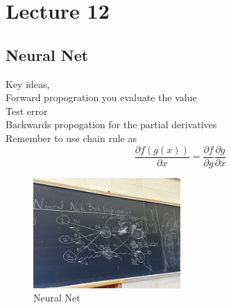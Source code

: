 \documentclass[answers,12pt,addpoints]{exam}
\begin{document}
\section*{Lecture 12}
\subsection{Neural Net}
Key ideas, \\
Forward propogration you evaluate the value\\
Test error\\
Backwards propogation for the partial derivatives\\
Remember to use chain rule as 
$$ \frac{\partial f(g(x))}{\partial x} = \frac{\partial f}{\partial g} \frac{\partial g}{\partial x}$$
    \begin{figure}[h]
        \centering
        \includegraphics[width=0.5\textwidth]{NN.jpg}
        \caption{Neural Net}
        \label{fig:example_image}
    \end{figure}
\end{document}
